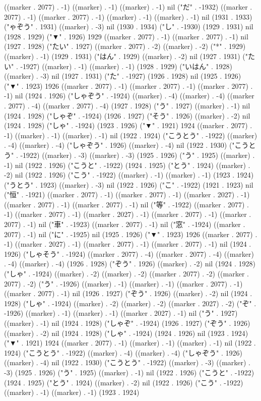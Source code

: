 ((marker . 2077) . -1) ((marker) . -1) ((marker) . -1) nil ("だ" . -1932) ((marker . 2077) . -1) ((marker . 2077) . -1) ((marker) . -1) ((marker) . -1) nil (1931 . 1933) ("ゃぞう" . 1931) ((marker) . -3) nil (1930 . 1934) ("し" . -1930) (1929 . 1931) nil (1928 . 1929) ("▼" . 1926) 1929 ((marker . 2077) . -1) ((marker . 2077) . -1) nil (1927 . 1928) ("たい" . 1927) ((marker . 2077) . -2) ((marker) . -2) ("*" . 1929) ((marker) . -1) (1929 . 1931) ("はん" . 1929) ((marker) . -2) nil (1927 . 1931) ("たい" . -1927) ((marker) . -1) ((marker) . -1) (1928 . 1929) ("いはん" . 1928) ((marker) . -3) nil (1927 . 1931) ("た" . -1927) (1926 . 1928) nil (1925 . 1926) ("▼" . 1923) 1926 ((marker . 2077) . -1) ((marker . 2077) . -1) ((marker . 2077) . -1) nil (1924 . 1926) ("しゃぞう" . -1924) ((marker) . -4) ((marker) . -4) ((marker . 2077) . -4) ((marker . 2077) . -4) (1927 . 1928) ("う" . 1927) ((marker) . -1) nil (1924 . 1928) ("しゃぞ" . -1924) (1926 . 1927) ("そう" . 1926) ((marker) . -2) nil (1924 . 1928) ("しゃ" . -1924) (1923 . 1926) ("▼" . 1921) 1924 ((marker . 2077) . -1) ((marker) . -1) ((marker) . -1) nil (1922 . 1924) ("こうとう" . -1922) ((marker) . -4) ((marker) . -4) ("しゃぞう" . 1926) ((marker) . -4) nil (1922 . 1930) ("こうとう" . -1922) ((marker) . -3) ((marker) . -3) (1925 . 1926) ("う" . 1925) ((marker) . -1) nil (1922 . 1926) ("こうと" . -1922) (1924 . 1925) ("とう" . 1924) ((marker) . -2) nil (1922 . 1926) ("こう" . -1922) ((marker) . -1) ((marker) . -1) (1923 . 1924) ("うとう" . 1923) ((marker) . -3) nil (1922 . 1926) ("こ" . -1922) (1921 . 1923) nil ("恒" . -1921) ((marker . 2077) . -1) ((marker . 2077) . -1) ((marker . 2027) . -1) ((marker . 2077) . -1) ((marker . 2077) . -1) nil ("等" . -1922) ((marker . 2077) . -1) ((marker . 2077) . -1) ((marker . 2027) . -1) ((marker . 2077) . -1) ((marker . 2077) . -1) nil ("車" . -1923) ((marker . 2077) . -1) nil ("窓" . -1924) ((marker . 2077) . -1) nil ("に" . -1925) nil (1925 . 1926) ("▼" . 1923) 1926 ((marker . 2077) . -1) ((marker . 2027) . -1) ((marker . 2077) . -1) ((marker . 2077) . -1) nil (1924 . 1926) ("しゃそう" . -1924) ((marker . 2077) . -4) ((marker . 2077) . -4) ((marker) . -4) ((marker) . -4) (1926 . 1928) ("ぞう" . 1926) ((marker) . -2) nil (1924 . 1928) ("しゃ" . -1924) ((marker) . -2) ((marker) . -2) ((marker . 2077) . -2) ((marker . 2077) . -2) ("う" . -1926) ((marker) . -1) ((marker) . -1) ((marker . 2077) . -1) ((marker . 2077) . -1) nil (1926 . 1927) ("ぞう" . 1926) ((marker) . -2) nil (1924 . 1928) ("しゃ" . -1924) ((marker) . -2) ((marker) . -2) ((marker . 2027) . -2) ("ぞ" . -1926) ((marker) . -1) ((marker) . -1) ((marker . 2027) . -1) nil ("う" . 1927) ((marker) . -1) nil (1924 . 1928) ("しゃぞ" . -1924) (1926 . 1927) ("ぞう" . 1926) ((marker) . -2) nil (1924 . 1928) ("しゃ" . -1924) (1924 . 1926) nil (1923 . 1924) ("▼" . 1921) 1924 ((marker . 2077) . -1) ((marker) . -1) ((marker) . -1) nil (1922 . 1924) ("こうとう" . -1922) ((marker) . -4) ((marker) . -4) ("しゃぞう" . 1926) ((marker) . -4) nil (1922 . 1930) ("こうとう" . -1922) ((marker) . -3) ((marker) . -3) (1925 . 1926) ("う" . 1925) ((marker) . -1) nil (1922 . 1926) ("こうと" . -1922) (1924 . 1925) ("とう" . 1924) ((marker) . -2) nil (1922 . 1926) ("こう" . -1922) ((marker) . -1) ((marker) . -1) (1923 . 1924) 